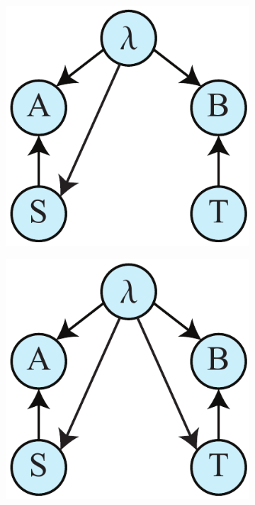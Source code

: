 \documentclass[letterpaper,onecolumn,nofootinbib]{revtex4}
\begin{document}
\begin{figure}[h]
        \begin{subfigure}[b]{0.18\textwidth}
                	\centering
        		\includegraphics[width=\textwidth]{superdet-1}
		\subcaption{}
		\label{fig:superdeta}
	\end{subfigure}
	\hspace{5em}
        \begin{subfigure}[b]{0.18\textwidth}
                	\centering
        	\includegraphics[width=\textwidth]{superdet}

\end{subfigure}
\end{figure}
\end{document}
